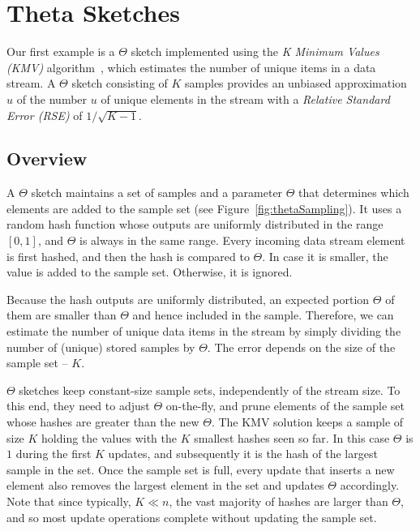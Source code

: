 \section{Theta Sketches}
\label{sec:theta}

Our first example is a $\Theta$ sketch implemented using  the 
\emph{K Minimum Values  (KMV)} algorithm~\cite{KMV}, 
which estimates the number of unique items in a data stream. 
A $\Theta$ sketch consisting of  $K$ samples provides an unbiased approximation $\hat{u}$ of the 
number $u$ of unique elements in the stream with a \emph{Relative Standard Error (RSE)} of $1/\sqrt{K-1}$.


\subsection{Overview}
\label{ssec:theta-overview}


A $\Theta$ sketch maintains a set of samples and a parameter $\Theta$
that determines which elements are added to the sample set (see Figure~\ref{fig:thetaSampling}). 
It uses a random hash function whose outputs are uniformly distributed
in the range $[0,1]$, and $\Theta$ is always in the same range.  
Every incoming data stream element is first hashed, and then the hash is compared to $\Theta$. 
In case it is smaller, the value is added to the sample set.  Otherwise, it is ignored. 

Because the hash outputs are uniformly distributed, an expected
portion $\Theta$ of them are smaller than $\Theta$ and hence included in the sample. 
Therefore, we can estimate the number of unique data items in the stream by
simply dividing the number of (unique) stored samples by $\Theta$.
The error depends on the size of the sample set -- $K$. 

 $\Theta$ sketches keep constant-size sample sets, independently of the stream size. 
 To this end, they need to adjust $\Theta$ on-the-fly, and prune elements of 
 the sample set whose hashes are greater than the new $\Theta$.
The KMV solution keeps a sample of size $K$ 
holding the  values with the $K$ smallest hashes seen so far. 
In this case $\Theta$ is $1$ during the first $K$ updates, and 
subsequently it is the hash of the largest sample in the set.
Once the sample set is full,
every update that inserts  a new element also removes the largest
element in the set and updates $\Theta$ accordingly. 
Note that since typically, $K \ll n$, the vast majority of hashes are larger than 
$\Theta$,  and so most update operations complete without updating the sample set. 


